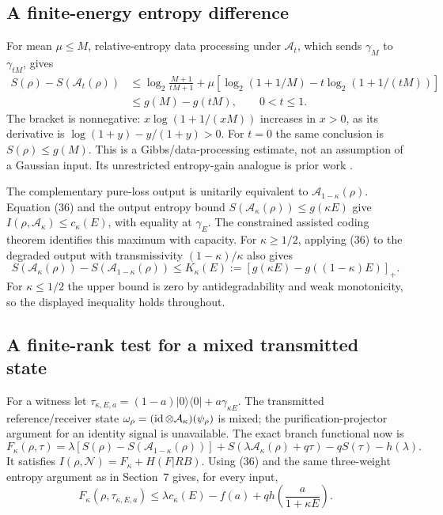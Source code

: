 \subsection{A finite-energy entropy difference}
For mean \(\mu\le M\), relative-entropy data processing under
\(\mathcal A_t\), which sends \(\gamma_M\) to \(\gamma_{tM}\), gives
\[
 \begin{aligned}
 S(\rho)-S(\mathcal A_t(\rho))
 &\le \log_2\frac{M+1}{tM+1}
  +\mu\left[\log_2(1+1/M)-t\log_2(1+1/(tM))\right]\\
 &\le g(M)-g(tM),\qquad 0<t\le1 .
 \end{aligned}                                                 \tag{36}
\]
The bracket is nonnegative: \(x\log(1+1/(xM))\) increases in \(x>0\),
as its derivative is \(\log(1+y)-y/(1+y)>0\).
For \(t=0\) the same conclusion is \(S(\rho)\le g(M)\).
This is a Gibbs/data-processing estimate, not an assumption of a Gaussian
input. Its unrestricted entropy-gain analogue is prior work \cite{gain}.

The complementary pure-loss output is unitarily equivalent to
\(\mathcal A_{1-\kappa}(\rho)\). Equation (36) and the output entropy
bound \(S(\mathcal A_\kappa(\rho))\le g(\kappa E)\) give
\(I(\rho,\mathcal A_\kappa)\le c_\kappa(E)\), with equality at
\(\gamma_E\). The constrained assisted coding theorem \cite{hs}
identifies this maximum with capacity.
For \(\kappa\ge1/2\), applying (36) to the degraded output with
transmissivity \((1-\kappa)/\kappa\) also gives
\[
 S(\mathcal A_\kappa(\rho))-S(\mathcal A_{1-\kappa}(\rho))
 \le K_\kappa(E):=[g(\kappa E)-g((1-\kappa)E)]_+ .
\]
For \(\kappa\le1/2\) the upper bound is zero by antidegradability and
weak monotonicity, so the displayed inequality holds throughout.

\subsection{A finite-rank test for a mixed transmitted state}
For a witness let \(\tau_{\kappa,E,a}=(1-a)|0\rangle\langle0|
                                       +a\gamma_{\kappa E}\).
The transmitted reference/receiver state
\(\omega_\rho=(\operatorname{id}\otimes\mathcal A_\kappa)(\psi_\rho)\) is mixed;
the purification-projector argument for an identity signal is unavailable.
The exact branch functional now is
\[
 F_\kappa(\rho,\tau)
 =\lambda[S(\rho)-S(\mathcal A_{1-\kappa}(\rho))]
      +S(\lambda\mathcal A_\kappa(\rho)+q\tau)-qS(\tau)-h(\lambda).
\]
It satisfies \(I(\rho,\mathcal N)=F_\kappa+H(F|RB)\).
Using (36) and the same three-weight entropy argument as in Section~7
gives, for every input,
\[
 F_\kappa(\rho,\tau_{\kappa,E,a})
 \le\lambda c_\kappa(E)-f(a)+q h\!\left(\frac{a}{1+\kappa E}\right).
                                                               \tag{37}
\]

